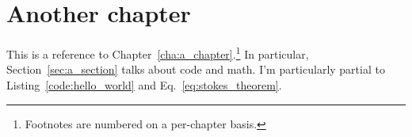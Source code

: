 \chapter{Another chapter}
\label{cha:another_chapter}

This is a reference to Chapter~\ref{cha:a_chapter}.\footnote{Footnotes are numbered on a per-chapter basis.} In particular, Section~\ref{sec:a_section} talks about code and math. I'm particularly partial to Listing~\ref{code:hello_world} and Eq.~\eqref{eq:stokes_theorem}.